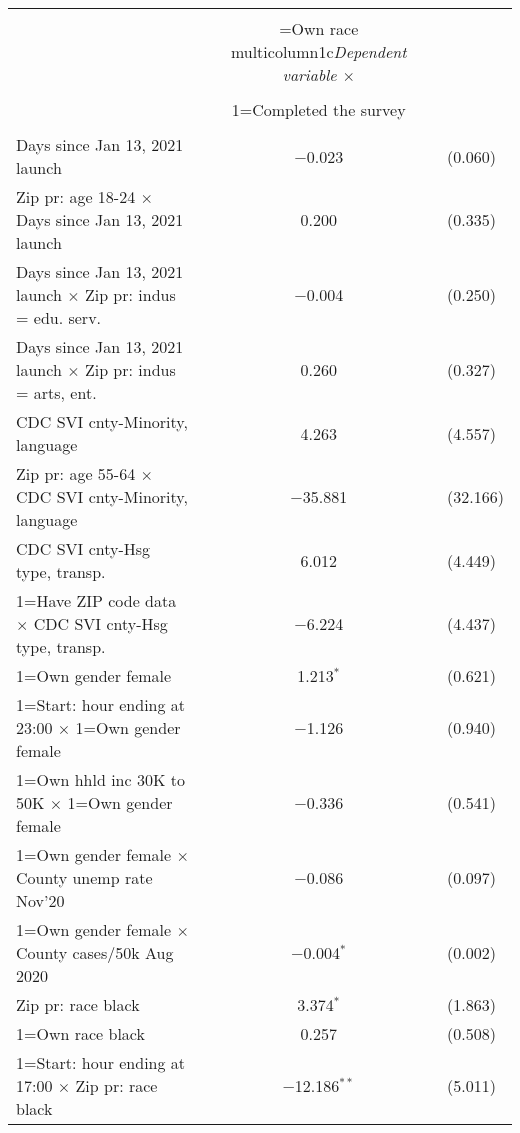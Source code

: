
\begin{table}[!htbp] \centering 
  \caption{} 
  \label{} 
\begin{tabular}{@{\extracolsep{5pt}}lc} 
\\[-1.8ex]\hline 
\hline \\[-1.8ex] 
 & \1=Own race multicolumn{1}{c}{\textit{Dependent variable $\times$ }} \\ 
\\[-1.8ex] & 1=Completed the survey \\ 
\hline \\[-1.8ex] 
 Days since Jan 13, 2021 launch & $-$0.023 & (0.060) \\ 
  Zip pr: age 18-24 $\times$ Days since Jan 13, 2021 launch & 0.200 & (0.335) \\ 
  Days since Jan 13, 2021 launch $\times$ Zip pr: indus = edu. serv. & $-$0.004 & (0.250) \\ 
  Days since Jan 13, 2021 launch $\times$ Zip pr: indus = arts, ent. & 0.260 & (0.327) \\ 
  CDC SVI cnty-Minority, language & 4.263 & (4.557) \\ 
  Zip pr: age 55-64 $\times$ CDC SVI cnty-Minority, language & $-$35.881 & (32.166) \\ 
  CDC SVI cnty-Hsg type, transp. & 6.012 & (4.449) \\ 
  1=Have ZIP code data $\times$ CDC SVI cnty-Hsg type, transp. & $-$6.224 & (4.437) \\ 
  1=Own gender female & 1.213$^{*}$ & (0.621) \\ 
  1=Start: hour ending at 23:00 $\times$ 1=Own gender female & $-$1.126 & (0.940) \\ 
  1=Own hhld inc 30K to 50K $\times$ 1=Own gender female & $-$0.336 & (0.541) \\ 
  1=Own gender female $\times$ County unemp rate Nov'20 & $-$0.086 & (0.097) \\ 
  1=Own gender female $\times$ County cases/50k Aug 2020 & $-$0.004$^{*}$ & (0.002) \\ 
  Zip pr: race black & 3.374$^{*}$ & (1.863) \\ 
  1=Own race black & 0.257 & (0.508) \\ 
  1=Start: hour ending at 17:00 $\times$ Zip pr: race black & $-$12.186$^{**}$ & (5.011) \\ 

\end{tabular}
\end{table}
